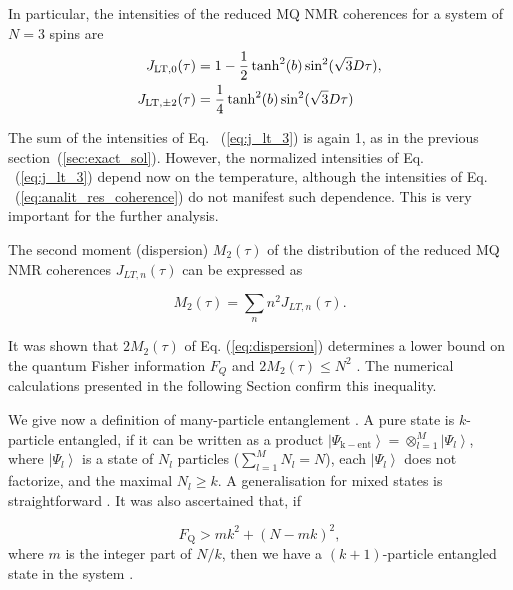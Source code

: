 \documentclass[
    pra,  
    twocolumn, 
    floatfix, 
    amsmath, 
    amssymb, 
    superscriptaddress
]{revtex4-1}
\begin{document}
In particular, the intensities of the reduced MQ NMR coherences for a system of $N=3$ spins are 
\begin{align}
    \label{eq:j_lt_3}
    J_{\mathrm{LT}, 0}(\tau) & = 1 - \frac 1 2 \tanh^2(b)\sin^2(\sqrt 3 D \tau), \notag \\
    J_{\mathrm{LT},\pm 2}(\tau) & = \frac 1 4 \tanh^2(b)\sin^2(\sqrt 3 D \tau)
\end{align}

The sum of the intensities of Eq. ~(\ref{eq:j_lt_3}) is again 1, as in the previous section~(\ref{sec:exact_sol}). However, the normalized intensities of Eq. ~(\ref{eq:j_lt_3})  depend now on the temperature, although the intensities of Eq. ~(\ref{eq:analit_res_coherence}) do not manifest such dependence. This is very important for the further analysis.

The second moment (dispersion) $M_2(\tau)$ of the distribution of the  reduced MQ NMR coherences $J_{LT, n} (\tau)$ can be expressed \cite{growrh_of_mqcoh} as

\begin{equation}
    \label{eq:dispersion}
    M_2(\tau) = \sum\limits_n n^2 J_{LT, n} (\tau).
\end{equation}

It was shown \cite{otoc_to_enanglement_via_mqcoh} that $2M_2(\tau)$ of Eq. (\ref{eq:dispersion}) determines a lower bound on the quantum Fisher information $F_{Q}$ \cite{qmetrology_for_qinfo,qmetrology_nonclassiscal_state} and $2M_2(\tau) \leq N^2$ \cite{fisher_and_entanglement}.
The numerical calculations presented in the following Section confirm this inequality.
\par
We give now a definition of many-particle entanglement  \cite{fisher_and_entanglement}. 
A pure state is $k$-particle entangled, if it can be written as a product \mbox{$\left| \Psi_\mathrm{k-ent} \right\rangle = \otimes^M_{l=1} \left| \Psi_l \right\rangle$}, where $\left| \Psi_l \right\rangle$ is a state of $N_l$ particles \mbox{($\sum\limits_{l=1}^M N_l = N$)}, each  $\left| \Psi_l \right\rangle$ does not factorize, and the maximal $N_l \geq k$. A generalisation for mixed states is straightforward \cite{fisher_and_entanglement}.
It was also ascertained \cite{qmetrology_for_qinfo,qmetrology_nonclassiscal_state} that, if

\begin{equation}
    \label{eq:fisher_criteria}
    F_{\mathrm{Q}} > mk^2 + (N-mk)^2,
\end{equation}
where $m$ is the integer part of $N/k$, then we have a $(k+1)$-particle entangled state in the system \cite{qmetrology_for_qinfo,qmetrology_nonclassiscal_state}.
\end{document}
